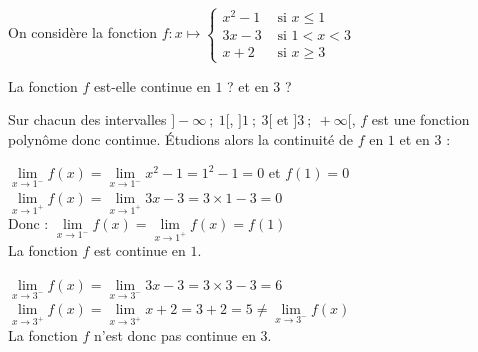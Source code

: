 \documentclass[11pt,a4paper]{article}  %
\begin{document}
	\graphicspath{{images/}}

	\begin{center}

	\end{center}


On considère la fonction $f: x \mapsto \begin{cases}x^2-1 & \text { si } x \leqslant 1 \\ 3x-3 & \text { si } 1<x<3  \\ x+2 & \text { si } x \geqslant 3\end{cases}$

La fonction $f$ est-elle continue en $1$ ? et en $3$ ?

\begin{corrBox}
	Sur chacun des intervalles $]-\infty\ ;\ 1[$, $]1\ ;\ 3[$ et $]3\ ;\ +\infty[$, $f$ est une fonction polynôme donc continue. Étudions alors la continuité de \(f\) en $1$ et en $3$ :

	\begin{itemMet}
		\item \(\lim \limits_{x \rightarrow 1^{-}} f(x)=\lim \limits_{x \rightarrow 1^{-}}x^2-1=1^2-1=0\) \quad et \quad $f(1)=0$\\
		\(\lim \limits_{x \rightarrow 1^{+}} f(x)=\lim \limits_{x \rightarrow 1^{+}} 3x-3=3\times 1-3=0\)\\
		Donc : \(\lim \limits_{x \rightarrow 1^{-}} f(x)=\lim \limits_{x \rightarrow 1^{+}} f(x)=f(1)\)\\
		La fonction \(f\) est continue en $1$.
		\item \(\lim \limits_{x \rightarrow 3^{-}} f(x)=\lim \limits_{x \rightarrow 3^{-}} 3x-3=3\times 3-3=6\)\\
		\(\lim \limits_{x \rightarrow 3^{+}} f(x)=\lim \limits_{x \rightarrow 3^{+}}x+2=3+2=5\neq\lim \limits_{x \rightarrow 3^{-}} f(x)\)\\
		La fonction \(f\) n'est donc pas continue en $3$.
	\end{itemMet}
\end{corrBox}
\end{document}
